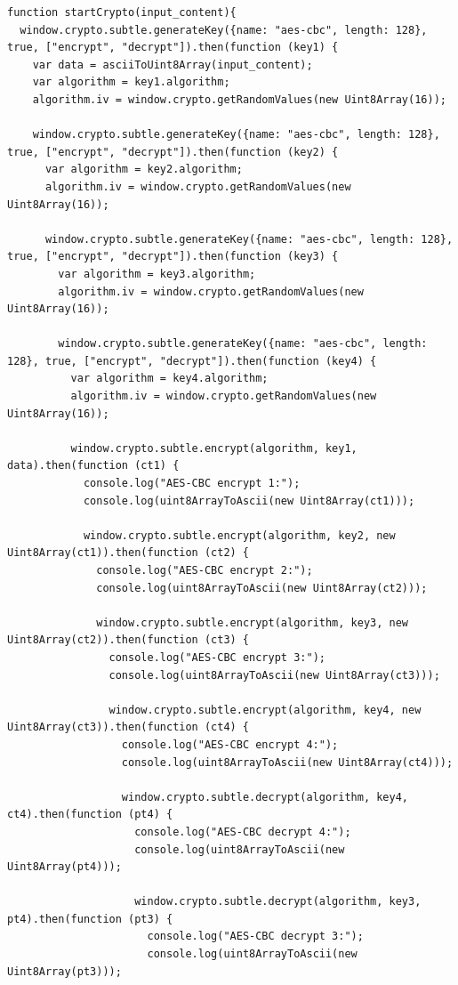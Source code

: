 \documentclass[a4paper,12pt]{report}
\begin{document}
	\begin{lstlisting}
function startCrypto(input_content){
  window.crypto.subtle.generateKey({name: "aes-cbc", length: 128}, true, ["encrypt", "decrypt"]).then(function (key1) {
    var data = asciiToUint8Array(input_content);
    var algorithm = key1.algorithm;
    algorithm.iv = window.crypto.getRandomValues(new Uint8Array(16));

    window.crypto.subtle.generateKey({name: "aes-cbc", length: 128}, true, ["encrypt", "decrypt"]).then(function (key2) {
      var algorithm = key2.algorithm;
      algorithm.iv = window.crypto.getRandomValues(new Uint8Array(16));

      window.crypto.subtle.generateKey({name: "aes-cbc", length: 128}, true, ["encrypt", "decrypt"]).then(function (key3) {
        var algorithm = key3.algorithm;
        algorithm.iv = window.crypto.getRandomValues(new Uint8Array(16));

        window.crypto.subtle.generateKey({name: "aes-cbc", length: 128}, true, ["encrypt", "decrypt"]).then(function (key4) {
          var algorithm = key4.algorithm;
          algorithm.iv = window.crypto.getRandomValues(new Uint8Array(16));

          window.crypto.subtle.encrypt(algorithm, key1, data).then(function (ct1) {
            console.log("AES-CBC encrypt 1:");
            console.log(uint8ArrayToAscii(new Uint8Array(ct1)));

            window.crypto.subtle.encrypt(algorithm, key2, new Uint8Array(ct1)).then(function (ct2) {
              console.log("AES-CBC encrypt 2:");
              console.log(uint8ArrayToAscii(new Uint8Array(ct2)));

              window.crypto.subtle.encrypt(algorithm, key3, new Uint8Array(ct2)).then(function (ct3) {
                console.log("AES-CBC encrypt 3:");
                console.log(uint8ArrayToAscii(new Uint8Array(ct3)));

                window.crypto.subtle.encrypt(algorithm, key4, new Uint8Array(ct3)).then(function (ct4) {
                  console.log("AES-CBC encrypt 4:");
                  console.log(uint8ArrayToAscii(new Uint8Array(ct4)));

                  window.crypto.subtle.decrypt(algorithm, key4, ct4).then(function (pt4) {
                    console.log("AES-CBC decrypt 4:");
                    console.log(uint8ArrayToAscii(new Uint8Array(pt4)));

                    window.crypto.subtle.decrypt(algorithm, key3, pt4).then(function (pt3) {
                      console.log("AES-CBC decrypt 3:");
                      console.log(uint8ArrayToAscii(new Uint8Array(pt3)));


\end{lstlisting}
\end{document}
